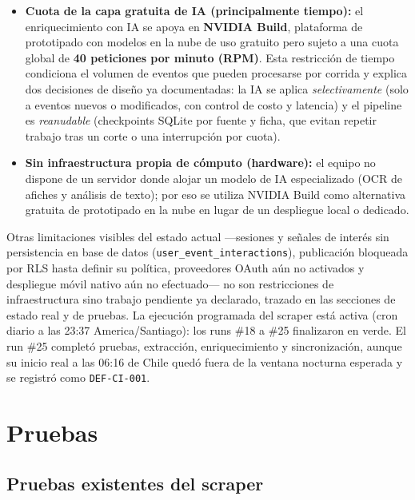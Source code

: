 \begin{itemize}[leftmargin=1.4em]
    \item \textbf{Cuota de la capa gratuita de IA (principalmente tiempo):} el
    enriquecimiento con IA se apoya en \textbf{NVIDIA Build}, plataforma de prototipado
    con modelos en la nube de uso gratuito pero sujeto a una cuota global de
    \textbf{40 peticiones por minuto (RPM)}. Esta restricción de tiempo condiciona el
    volumen de eventos que pueden procesarse por corrida y explica dos decisiones de
    diseño ya documentadas: la IA se aplica \emph{selectivamente} (solo a eventos
    nuevos o modificados, con control de costo y latencia) y el pipeline es
    \emph{reanudable} (checkpoints SQLite por fuente y ficha, que evitan repetir
    trabajo tras un corte o una interrupción por cuota).
    \item \textbf{Sin infraestructura propia de cómputo (hardware):} el equipo no
    dispone de un servidor donde alojar un modelo de IA especializado (OCR de afiches y
    análisis de texto); por eso se utiliza NVIDIA Build como alternativa gratuita de
    prototipado en la nube en lugar de un despliegue local o dedicado.
\end{itemize}

Otras limitaciones visibles del estado actual ---sesiones y señales de interés sin
persistencia en base de datos (\texttt{user\_event\_interactions}), publicación
bloqueada por RLS hasta definir su política, proveedores OAuth aún no activados y
despliegue móvil nativo aún no efectuado--- no son restricciones de infraestructura sino trabajo
pendiente ya declarado, trazado en las secciones de estado real y de pruebas. La ejecución
programada del scraper está activa (cron diario a las 23:37 America/Santiago): los runs
\#18 a \#25 finalizaron en verde. El run \#25 completó pruebas, extracción,
enriquecimiento y sincronización, aunque su inicio real a las 06:16 de Chile quedó fuera
de la ventana nocturna esperada y se registró como \texttt{DEF-CI-001}.


\section{Pruebas}
\label{sec:pruebas}

\subsection{Pruebas existentes del scraper}

